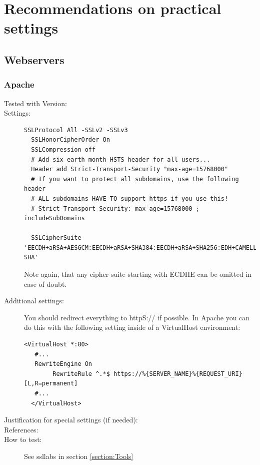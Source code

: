 \newpage
\section{Recommendations on practical settings}
\label{section:PracticalSettings}


\subsection{Webservers}

\subsubsection{Apache}

\begin{description}
\item[Tested with Version:]

\item[Settings:] \mbox{}

\begin{lstlisting}[breaklines]
  SSLProtocol All -SSLv2 -SSLv3 
  SSLHonorCipherOrder On
  SSLCompression off
  # Add six earth month HSTS header for all users...
  Header add Strict-Transport-Security "max-age=15768000"
  # If you want to protect all subdomains, use the following header
  # ALL subdomains HAVE TO support https if you use this!
  # Strict-Transport-Security: max-age=15768000 ; includeSubDomains

  SSLCipherSuite 'EECDH+aRSA+AESGCM:EECDH+aRSA+SHA384:EECDH+aRSA+SHA256:EDH+CAMELLIA256:EECDH:EDH+aRSA:+SSLv3:!aNULL:!eNULL:!LOW:!3DES:!MD5:!EXP:!PSK:!SRP:!DSS:!RC4:!SEED:!AES128:!CAMELLIA128:!ECDSA:AES256-SHA'
\end{lstlisting}

Note again, that any cipher suite starting with ECDHE  can be omitted in case of doubt.

\item[Additional settings:]

You should redirect everything to httpS:// if possible. In Apache you can do this with the following setting inside of a VirtualHost environment:

\begin{lstlisting}[breaklines]
  <VirtualHost *:80>
   #...
   RewriteEngine On
        RewriteRule ^.*$ https://%{SERVER_NAME}%{REQUEST_URI} [L,R=permanent]
   #...
  </VirtualHost>
\end{lstlisting}

\item[Justification for special settings (if needed):]

\item[References:]

\item[How to test:]

See ssllabs in section \ref{section:Tools}

\end{description}


